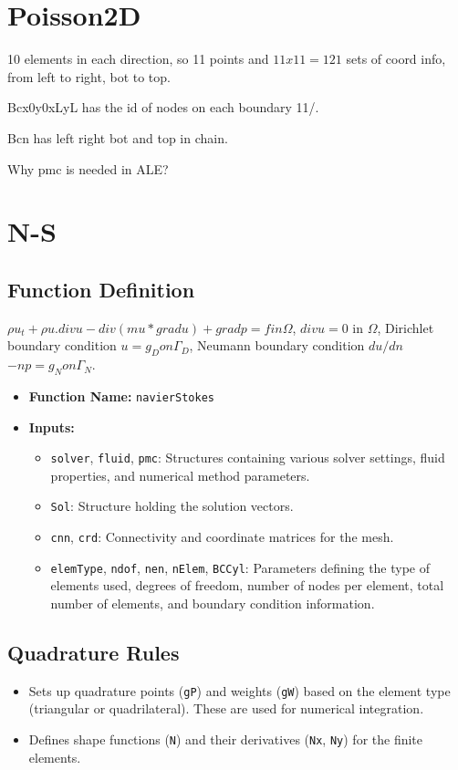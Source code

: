 \documentclass[a4paper,12pt]{article} %
\begin{document}
\section{Poisson2D}
10 elements in each direction, so 11 points and $11x11=121$ sets of coord info, from left to right, bot to top.

Bcx0y0xLyL has the id of nodes on each boundary 11/.

Bcn has left right bot and top in chain.

Why pmc is needed in ALE?







\section{N-S}
\subsection*{Function Definition}

$\rho u_t + \rho u.div u - div(mu*grad u) + grad p = f in \Omega$,    
$div u = 0$  in $\Omega$,                           
Dirichlet boundary condition        $u = g_D  on \Gamma_D$,         
Neumann boundary condition $du/dn$ $- np = g_N  on \Gamma_N$. 

\begin{itemize}
    \item \textbf{Function Name:} \texttt{navierStokes}
    \item \textbf{Inputs:} 
    \begin{itemize}
        \item \texttt{solver}, \texttt{fluid}, \texttt{pmc}: Structures containing various solver settings, fluid properties, and numerical method parameters.
        \item \texttt{Sol}: Structure holding the solution vectors.
        \item \texttt{cnn}, \texttt{crd}: Connectivity and coordinate matrices for the mesh.
        \item \texttt{elemType}, \texttt{ndof}, \texttt{nen}, \texttt{nElem}, \texttt{BCCyl}: Parameters defining the type of elements used, degrees of freedom, number of nodes per element, total number of elements, and boundary condition information.
    \end{itemize}
\end{itemize}

\subsection*{Quadrature Rules}
\begin{itemize}
    \item Sets up quadrature points (\texttt{gP}) and weights (\texttt{gW}) based on the element type (triangular or quadrilateral). These are used for numerical integration.
    \item Defines shape functions (\texttt{N}) and their derivatives (\texttt{Nx}, \texttt{Ny}) for the finite elements.
\end{itemize}
\end{document}
